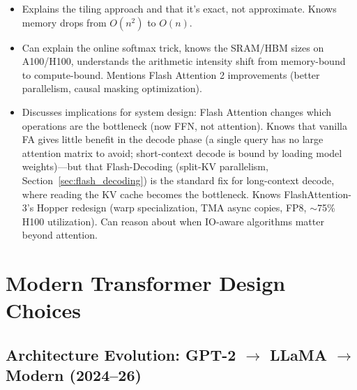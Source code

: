 \begin{interviewq}
\goodgreat
\begin{itemize}
    \item {} Explains the tiling approach and that it's exact, not approximate. Knows memory drops from $O(n^2)$ to $O(n)$.
    \item {} Can explain the online softmax trick, knows the SRAM/HBM sizes on A100/H100, understands the arithmetic intensity shift from memory-bound to compute-bound. Mentions Flash Attention 2 improvements (better parallelism, causal masking optimization).
    \item {} Discusses implications for system design: Flash Attention changes which operations are the bottleneck (now FFN, not attention). Knows that vanilla FA gives little benefit in the decode phase (a single query has no large attention matrix to avoid; short-context decode is bound by loading model weights)---but that Flash-Decoding (split-KV parallelism, Section~\ref{sec:flash_decoding}) is the standard fix for long-context decode, where reading the KV cache becomes the bottleneck. Knows FlashAttention-3's Hopper redesign (warp specialization, TMA async copies, FP8, $\sim$75\% H100 utilization). Can reason about when IO-aware algorithms matter beyond attention.
\end{itemize}

\end{interviewq}

\section{Modern Transformer Design Choices}
\label{sec:modern_design}

\subsection{Architecture Evolution: GPT-2 $\to$ LLaMA $\to$ Modern (2024--26)}

